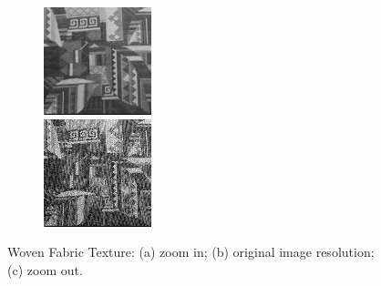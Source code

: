 \begin{figure}[!h]
\begin{subfigure}{0.39\linewidth}
\caption{}
\end{subfigure}
\begin{subfigure}{.19\linewidth}
  \centering
\includegraphics[width=\linewidth]{img/ch5/tex_zoom_out_stage_3.png}\\
\vspace{0.05cm}
\includegraphics[width=\linewidth]{img/ch5/tex_zoom_out_stage_5.png}
\caption{}
\end{subfigure}
\caption{Woven Fabric Texture: (a) zoom in; (b) original image resolution; (c) zoom out.}
\label{f:pattern}
\end{figure}


